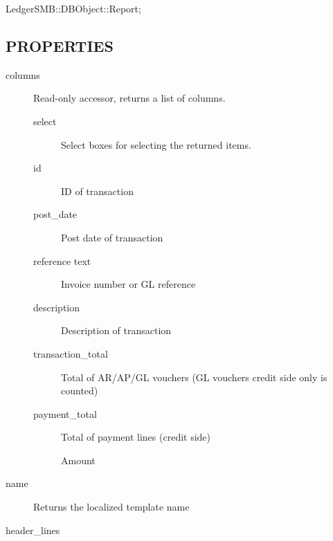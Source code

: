 \begin{description}
\begin{description}
\begin{description}
\begin{description}
\begin{description}
\begin{description}
\begin{description}
\begin{description}
\begin{description}
\begin{description}
\begin{description}
\item[{LedgerSMB::DBObject::Report;}] \mbox{}\end{description}
\subsection*{PROPERTIES\label{LedgerSMB::DBObject::Report::Unapproved::Batch_Overview_PROPERTIES}}
\begin{description}

\item[{columns}] \mbox{}

Read-only accessor, returns a list of columns.

\begin{description}

\item[{select}] \mbox{}

Select boxes for selecting the returned items.


\item[{id}] \mbox{}

ID of transaction


\item[{post\_date}] \mbox{}

Post date of transaction


\item[{reference text}] \mbox{}

Invoice number or GL reference


\item[{description}] \mbox{}

Description of transaction


\item[{transaction\_total}] \mbox{}

Total of AR/AP/GL vouchers (GL vouchers credit side only is counted)


\item[{payment\_total}] \mbox{}

Total of payment lines (credit side)



Amount

\end{description}

\item[{name}] \mbox{}

Returns the localized template name


\item[{header\_lines}] \mbox{}


\end{description}
\end{description}
\end{description}
\end{description}
\end{description}
\end{description}
\end{description}
\end{description}
\end{description}
\end{description}
\end{description}
